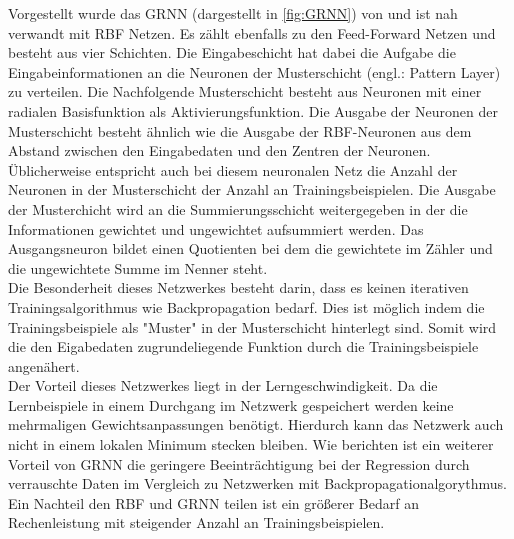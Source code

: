 Vorgestellt wurde das GRNN (dargestellt in \autoref{fig:GRNN}) von \citet{Specht1991} und ist nah verwandt mit RBF Netzen. Es zählt ebenfalls zu den Feed-Forward Netzen und besteht aus vier Schichten. Die Eingabeschicht hat dabei die Aufgabe die Eingabeinformationen an die Neuronen der Musterschicht (engl.: Pattern Layer) zu verteilen. Die Nachfolgende Musterschicht besteht aus Neuronen mit einer radialen Basisfunktion als Aktivierungsfunktion. Die Ausgabe der Neuronen der Musterschicht besteht ähnlich wie die Ausgabe der RBF-Neuronen aus dem Abstand zwischen den Eingabedaten und den Zentren der Neuronen. Üblicherweise entspricht auch bei diesem neuronalen Netz die Anzahl der Neuronen in der Musterschicht der Anzahl an Trainingsbeispielen. Die Ausgabe der Musterchicht wird an die Summierungsschicht weitergegeben in der die Informationen gewichtet und ungewichtet aufsummiert werden. Das Ausgangsneuron bildet einen Quotienten bei dem die gewichtete im Zähler und die ungewichtete Summe im Nenner steht.\\
Die Besonderheit dieses Netzwerkes besteht darin, dass es keinen iterativen Trainingsalgorithmus wie Backpropagation bedarf. Dies ist möglich indem die Trainingsbeispiele als "Muster" in der Musterschicht hinterlegt sind. Somit wird die den Eigabedaten zugrundeliegende Funktion durch die Trainingsbeispiele angenähert. \\
Der Vorteil dieses Netzwerkes liegt in der Lerngeschwindigkeit. Da die Lernbeispiele in einem Durchgang im Netzwerk gespeichert werden keine mehrmaligen Gewichtsanpassungen benötigt. Hierdurch kann das Netzwerk auch nicht in einem lokalen Minimum stecken bleiben. Wie \citet{Marqueza1993} berichten ist ein weiterer Vorteil von GRNN die geringere Beeinträchtigung bei der Regression durch verrauschte Daten im Vergleich zu Netzwerken mit Backpropagationalgorythmus.
Ein Nachteil den RBF und GRNN teilen ist ein größerer Bedarf an Rechenleistung mit steigender Anzahl an Trainingsbeispielen.  


